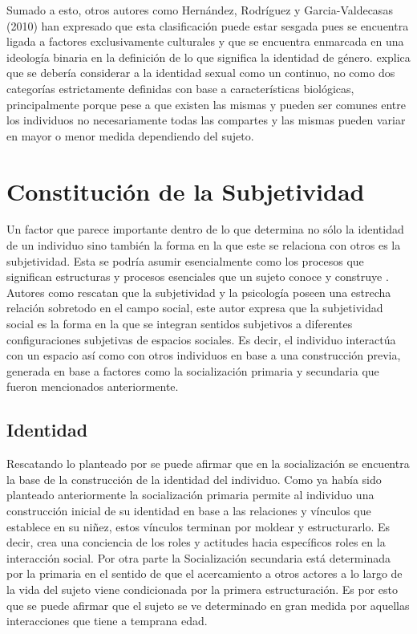 Sumado a esto, otros autores como Hernández,
Rodríguez y Garcia-Valdecasas (2010) han expresado que esta clasificación puede
estar sesgada pues se encuentra ligada a factores exclusivamente culturales y
que se encuentra enmarcada en una ideología binaria en la definición de lo que
significa la identidad de género. \textcite{Vargas2017} explica
que se debería considerar a la identidad sexual como un continuo, no como dos
categorías estrictamente definidas con base a características biológicas,
principalmente porque pese a que existen las mismas y pueden ser comunes entre
los individuos no necesariamente todas las compartes y las mismas pueden variar
en mayor o menor medida dependiendo del sujeto.

\section{Constitución de la Subjetividad}

Un factor que parece importante dentro de lo que determina no sólo la identidad
de un individuo sino también la forma en la que este se relaciona con otros es
la subjetividad. Esta se podría asumir
esencialmente como los procesos que significan estructuras y procesos esenciales
que un sujeto conoce y construye \parencite{Duesing2002}.  Autores como
 \textcite{Gonzalez2013}
rescatan que la subjetividad y la psicología poseen una estrecha relación
sobretodo en el campo social, este autor expresa que la subjetividad social es
la forma en la que se integran sentidos subjetivos a diferentes configuraciones
subjetivas de espacios sociales. Es decir, el individuo interactúa con un
espacio así como con otros individuos en base a una construcción previa,
generada en base a factores como la socialización primaria y secundaria que
fueron mencionados anteriormente.

\subsection{Identidad}

Rescatando lo planteado por \textcite{Berger1991} se puede afirmar que en la
socialización se encuentra la base de la construcción de la identidad del
individuo. Como ya había sido planteado anteriormente la socialización primaria
permite al individuo una construcción inicial de su identidad en base a las
relaciones y vínculos que establece en su niñez, estos vínculos terminan por
moldear y estructurarlo. Es decir, crea una conciencia de los roles y actitudes
hacia específicos roles en la interacción social. Por otra parte la
Socialización secundaria está determinada por la primaria en el sentido de que
el acercamiento a otros actores a lo largo de la vida del sujeto viene
condicionada por la primera estructuración. Es por esto que se puede afirmar que
el sujeto se ve determinado en gran medida por aquellas interacciones que tiene
a temprana edad.

